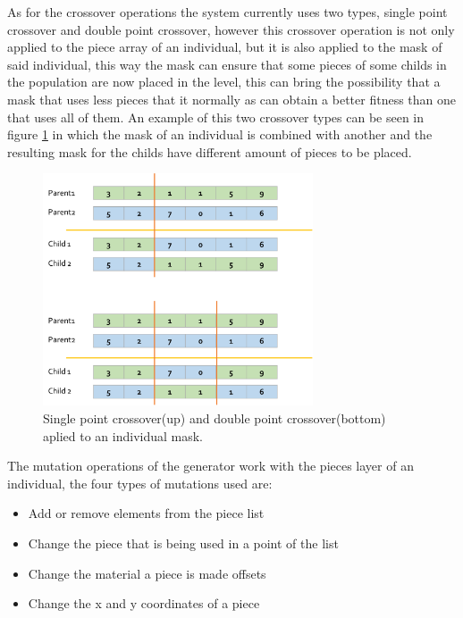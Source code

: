 \documentclass[conference]{IEEEtran}
\begin{document}
    As for the crossover operations the system currently uses two types, single
    point crossover and double point crossover, however this crossover operation is
    not only applied to the piece array of an individual, but it is also applied to
    the mask of said individual, this way the mask can ensure that some pieces of
    some childs in the population are now placed in the level, this can bring the
    possibility that a mask that uses less pieces that it normally as can obtain a
    better fitness than one that uses all of them. An example of this two crossover
    types can be seen in figure \ref{crossover} in which the mask of an individual
    is combined with another and the resulting mask for the childs have different
    amount of pieces to be placed.
    
    \begin{figure}[htbp]
        \centerline{\includegraphics[width=80mm]{Images/crossover.png}}
        \caption{Single point crossover(up) and double point crossover(bottom) aplied to an individual mask.}
        \label{crossover}
    \end{figure}
    
    The mutation operations of the generator work with the pieces layer of an
    individual, the four types of mutations used are:
    
    \begin{itemize}
        \item Add or remove elements from the piece list
        \item Change the piece that is being used in a point of the list
        \item Change the material a piece is made offsets
        \item Change the x and y coordinates of a piece
    \end{itemize}
    
\end{document}
